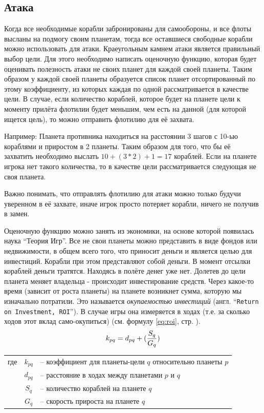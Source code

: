 \documentclass[12pt]{report}
\begin{document}
\subsection{Атака}
\label{sec:atack}
Когда все необходимые корабли забронированы для самообороны, и все флоты высланы на подмогу своим планетам, тогда все оставшиеся свободные корабли можно использовать для атаки. Краеугольным камнем атаки является правильный выбор цели. Для этого необходимо написать оценочную функцию, которая будет оценивать полезность атаки не своих планет для каждой своей планеты. Таким образом у каждой своей планеты образуется список планет отсортированный по этому коэффициенту, из которых каждая по одной рассматривается в качестве цели. В случае, если количество кораблей, которое будет на планете цели к моменту прилёта флотилии будет меньшим, чем есть на данной (для которой ищется цель), то можно отправить флотилию для её захвата. 

Например: Планета противника находиться на расстоянии 3 шагов с 10-ью кораблями и приростом в 2 планеты. Таким образом для того, что бы её захватить необходимо выслать $10 + (3 * 2) + 1 = 17$ кораблей. Если на планете игрока нет такого количества, то в качестве цели рассматривается следующая не своя планета.

Важно понимать, что отправлять флотилию для атаки можно только будучи уверенном в её захвате, иначе игрок просто потеряет корабли, ничего не получив в замен. 

Оценочную функцию можно занять из экономики, на основе которой появилась наука ``Теория Игр''. Все не свои планеты можно представить в виде фондов или недвижимости, в общем всего того, что приносит деньги и является целью для инвестиций. Корабли при этом представляют собой деньги. В момент отсылки кораблей деньги тратятся. Находясь в полёте денег уже нет. Долетев до цели планета меняет владельца - происходит инвестирование средств. Через какое-то время (зависит от роста планеты) на планете возникнет сумма, которую мы изначально потратили. Это называется \emph{окупаемостью инвестиций} (англ. ``\texttt{Return on Investment, ROI}''). В случае игры она измеряется в ходах (т.е. за сколько ходов этот вклад само-окупиться) (см. формулу \ref{eq:roi}, стр. \pageref{eq:roi}).
\pagebreak
\begin{equation}
\label{eq:roi}
\centering
k_{pq} = d_{pq} + (\frac{S_q}{G_q})
\end{equation}
\begin{tabular}{p{3cm} c l}
где & $k_{pq}$ & -- коэффициент для планеты-цели $q$ относительно планеты $p$ \\
	& $d_{pq}$ & -- расстояние в ходах между планетами $p$ и $q$ \\
	& $S_q$ & -- количество кораблей на планете $q$ \\
	& $G_q$ & -- скорость прироста на планете $q$ \\
\end{tabular}
\end{document}
